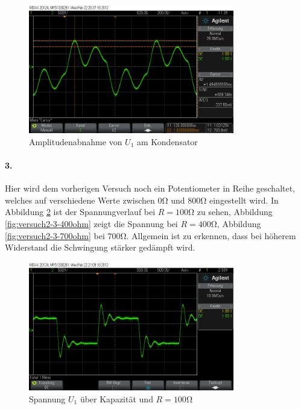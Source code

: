 \documentclass[a4paper]{article}
\begin{document}
\begin{figure}[H]
    \centering
    \includegraphics[width=0.8\textwidth]{versuch2_2_amplitude.png}
    \caption{Amplitudenabnahme von $U_1$ am Kondensator}
    \label{fig:versuch2-2-amplitude}
\end{figure}


\paragraph{3.}
Hier wird dem vorherigen Versuch noch ein Potentiometer in Reihe geschaltet, welches auf verschiedene Werte zwischen $0\si{\ohm}$ und $800\si{\ohm}$ eingestellt wird.
In Abbildung \ref{fig:versuch2-3-100ohm} ist der Spannungverlauf bei $R=100\si{\ohm}$ zu sehen, Abbildung \ref{fig:versuch2-3-400ohm} zeigt die Spannung bei $R=400\si{\ohm}$, Abbildung \ref{fig:versuch2-3-700ohm} bei $700\si{\ohm}$. Allgemein ist zu erkennen, dass bei höherem Widerstand die Schwingung stärker gedämpft wird.

\begin{figure}[H]
    \centering
    \includegraphics[width=0.8\textwidth]{versuch2_3_100ohm.png}
    \caption{Spannung $U_1$ über Kapazität und $R=100\si{\ohm}$}
    \label{fig:versuch2-3-100ohm}
\end{figure}
\end{document}
